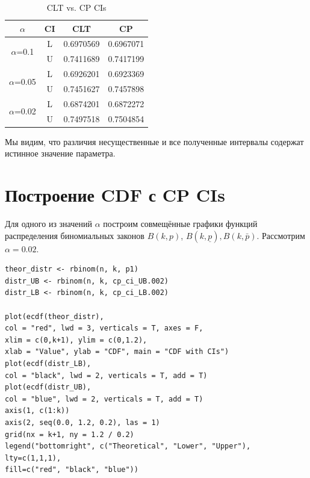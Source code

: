 \documentclass[14pt,a4paper]{scrartcl}
\begin{document}
\begin{table}[htbp]
	\centering
	\caption{CLT vs. CP CIs}
	\begin{tabular}{|c|c|c|c|}
		\hline
		$\alpha$ & CI    & CLT   & CP \bigstrut\\
		\hline
		\multirow{2}[4]{*}{$\alpha$=0.1} & L     & 0.6970569 & 0.6967071 \bigstrut\\
		\cline{2-4}          & U     & 0.7411689 & 0.7417199 \bigstrut\\
		\hline
		\multirow{2}[4]{*}{$\alpha$=0.05} & L     & 0.6926201 & 0.6923369 \bigstrut\\
		\cline{2-4}          & U     & 0.7451627 & 0.7457898 \bigstrut\\
		\hline
		\multirow{2}[4]{*}{$\alpha$=0.02} & L     & 0.6874201 & 0.6872272 \bigstrut\\
		\cline{2-4}          & U     & 0.7497518 & 0.7504854 \bigstrut\\
		\hline
	\end{tabular}%
	\label{tab:addlabel}%
\end{table}%

Мы видим, что различия несущественные и все полученные интервалы содержат истинное значение параметра.

\section{Построение CDF с CP CIs}
Для одного из значений $\alpha$ построим совмещённые графики функций распределения биномиальных законов $B(k,p)$, $B(k,\underline{p}), B(k,\bar{p})$. Рассмотрим $\alpha = 0.02$.
\begin{verbatim}
theor_distr <- rbinom(n, k, p1)
distr_UB <- rbinom(n, k, cp_ci_UB.002)
distr_LB <- rbinom(n, k, cp_ci_LB.002)

plot(ecdf(theor_distr), 
col = "red", lwd = 3, verticals = T, axes = F,
xlim = c(0,k+1), ylim = c(0,1.2),
xlab = "Value", ylab = "CDF", main = "CDF with CIs")
plot(ecdf(distr_LB), 
col = "black", lwd = 2, verticals = T, add = T)
plot(ecdf(distr_UB), 
col = "blue", lwd = 2, verticals = T, add = T)
axis(1, c(1:k))
axis(2, seq(0.0, 1.2, 0.2), las = 1)
grid(nx = k+1, ny = 1.2 / 0.2)
legend("bottomright", c("Theoretical", "Lower", "Upper"), 
lty=c(1,1,1), 
fill=c("red", "black", "blue"))
\end{verbatim}

\begin{figure}[h]
\end{figure}
\end{document}
